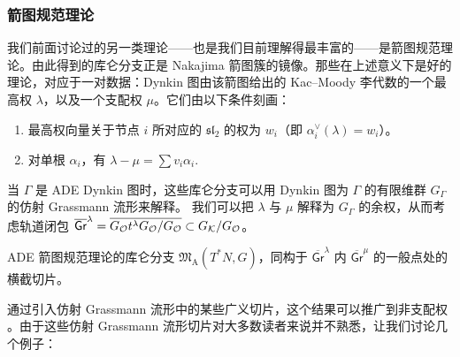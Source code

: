 \subsubsection{箭图规范理论}
\label{sec:quiver-gauge-theories}

我们前面讨论过的另一类理论——也是我们目前理解得最丰富的——是箭图规范理论。由此得到的库仑分支正是 Nakajima 箭图簇的镜像。那些在上述意义下是好的理论，对应于一对数据：Dynkin 图由该箭图给出的 Kac--Moody 李代数的一个最高权 $\lambda$，以及一个支配权 $\mu$。它们由以下条件刻画：
\begin{enumerate}
    \item 最高权向量关于节点 $i$ 所对应的 $\mathfrak{sl}_2$ 的权为 $w_i$（即 $\alpha_i^{\vee}(\lambda)=w_i$）。
    \item 对单根 $\alpha_i$，有 $\lambda-\mu=\sum v_i\alpha_i.$
\end{enumerate}
当 $\Gamma$ 是 ADE Dynkin 图时，这些库仑分支可以用 Dynkin 图为 $\Gamma$ 的有限维群 $G_{\Gamma}$ 的仿射 Grassmann 流形来解释。
我们可以把 $\lambda$ 与 $\mu$ 解释为 $G_{\Gamma}$ 的余权，从而考虑轨道闭包 $\overline{\mathsf{Gr}}^{\lambda} =\overline{G_{\mathcal{O}} t^{\lambda}G_{\mathcal{O}}/G_{\mathcal{O}}}\subset G_{\mathcal{K}}/G_{\mathcal{O}}$。
\begin{proposition}
	ADE 箭图规范理论的库仑分支\allowbreak{} $\mathfrak{M}_{\operatorname{A}}(T^*N,G)$，同构于 $\overline{\mathsf{Gr}}^{\lambda}$ 内 $\overline{\mathsf{Gr}}^{\mu}$ 的一般点处的横截切片\cite[Th. 3.10]{BFNplus}。
\end{proposition}

通过引入仿射 Grassmann 流形中的某些广义切片，这个结果可以推广到非支配权 \cite{BFNplus}。由于这些仿射 Grassmann 流形切片对大多数读者来说并不熟悉，让我们讨论几个例子：




